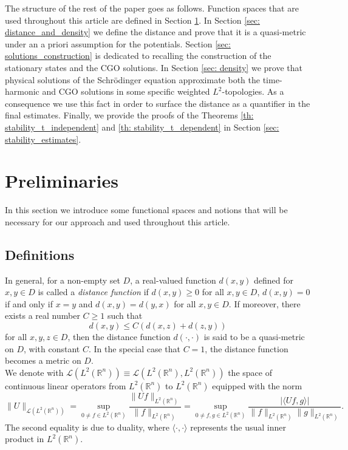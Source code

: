 \documentclass[10pt,a4paper]{amsart}
\theoremstyle{remark}
\theoremstyle{definition}
\newcommand{\R}{\mathbb{R}}
\newcommand{\dist}{\mathrm{dist}}
\def\cal{\mathcal}
\begin{document}


The structure of the rest of the paper goes as follows. Function spaces that are used throughout this article are defined in Section \ref{sec: preliminaries}. In Section \ref{sec: distance_and_density} we define the distance and prove that it is a quasi-metric under an a priori assumption for the potentials. Section \ref{sec: solutions_construction} is dedicated to recalling the construction of the stationary states and the CGO solutions. In Section \ref{sec: density} we prove that physical solutions of the Schr\"odinger equation approximate both the time-harmonic and CGO solutions in some specific weighted  $L^2$-topologies. As a consequence we use this fact in order to surface the distance as a quantifier in the final estimates. Finally, we provide the proofs of the Theorems \ref{th: stability_t_independent} and \ref{th: stability_t_dependent} in Section \ref{sec: stability_estimates}.



\section{Preliminaries}\label{sec: preliminaries} 
In this section we introduce some functional spaces and notions that will be necessary for our approach and used throughout this article.  

\subsection{Definitions}\label{subsec:def}
In general, for a non-empty set $D$, a real-valued function $d(x, y)$ defined for $x, y\in D$ is called a \textit{distance function} if $d(x, y) \geq 0$ for all $x, y\in D$, $d(x, y)=0$ if and only if $x=y$ and $d(x, y) = d(y, x)$ for all $x, y \in D$. If moreover, there exists a real number $C\geq 1$ such that 
\[
d(x, y) \leq C(d(x, z) + d(z, y))
\]
for all $x, y, z \in D$, then the distance function $d(\cdot, \cdot)$ is said to be a quasi-metric on $D$, with constant $C$. In the special case that $C=1$, the distance function becomes a metric on $D$.  \\

We denote with $\cal{L}(L^2(\R^n)) \equiv \cal{L}(L^2(\R^n), L^2(\R^n))$ the space of continuous linear operators from $L^2(\R^n)$ to $L^2(\R^n)$ equipped with the norm 
\[
\|U\|_{\cal{L}(L^2(\R^n))} = \sup_{  0 \neq f\in L^2(\R^n) } \frac{ \| Uf \|_{L^2(\R^n)}}{ \|f\|_{L^2(\R^n)}}
= \sup_{0\neq f, g\in L^2(\R^n)} \frac{|\langle Uf, g\rangle|}{\|f\|_{L^2(\R^n)}\|g\|_{L^2(\R^n)}}.
\]
The second equality is due to duality, where $\langle \cdot, \cdot\rangle$ represents the usual inner product in $L^2(\R^n)$. 
\end{document}
